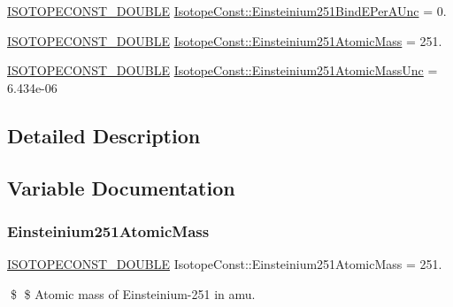 \begin{DoxyCompactItemize}
\item 
\mbox{\hyperlink{group___isotope_const-_macros_ga8f45a7272ce02c0b4c65c44636ed719a}{I\+S\+O\+T\+O\+P\+E\+C\+O\+N\+S\+T\+\_\+\+D\+O\+U\+B\+LE}} \mbox{\hyperlink{group___isotope_const-_einsteinium-_es251_ga80971f53d2e0a00912a095df08f6643f}{Isotope\+Const\+::\+Einsteinium251\+Bind\+E\+Per\+A\+Unc}} = 0.
\item 
\mbox{\hyperlink{group___isotope_const-_macros_ga8f45a7272ce02c0b4c65c44636ed719a}{I\+S\+O\+T\+O\+P\+E\+C\+O\+N\+S\+T\+\_\+\+D\+O\+U\+B\+LE}} \mbox{\hyperlink{group___isotope_const-_einsteinium-_es251_ga8da831cf73bba5b9247245afd5c2f49a}{Isotope\+Const\+::\+Einsteinium251\+Atomic\+Mass}} = 251.
\item 
\mbox{\hyperlink{group___isotope_const-_macros_ga8f45a7272ce02c0b4c65c44636ed719a}{I\+S\+O\+T\+O\+P\+E\+C\+O\+N\+S\+T\+\_\+\+D\+O\+U\+B\+LE}} \mbox{\hyperlink{group___isotope_const-_einsteinium-_es251_gae85293a61a71043af0141cdf1241904d}{Isotope\+Const\+::\+Einsteinium251\+Atomic\+Mass\+Unc}} = 6.\+434e-\/06
\end{DoxyCompactItemize}


\subsection{Detailed Description}


\subsection{Variable Documentation}
\mbox{\label{group___isotope_const-_einsteinium-_es251_ga8da831cf73bba5b9247245afd5c2f49a}} 
\subsubsection{\texorpdfstring{Einsteinium251\+Atomic\+Mass}{Einsteinium251AtomicMass}}
{\footnotesize\ttfamily \mbox{\hyperlink{group___isotope_const-_macros_ga8f45a7272ce02c0b4c65c44636ed719a}{I\+S\+O\+T\+O\+P\+E\+C\+O\+N\+S\+T\+\_\+\+D\+O\+U\+B\+LE}} Isotope\+Const\+::\+Einsteinium251\+Atomic\+Mass = 251.}

\$ \$ Atomic mass of Einsteinium-\/251 in amu. \mbox{\label{group___isotope_const-_einsteinium-_es251_gae85293a61a71043af0141cdf1241904d}} 

